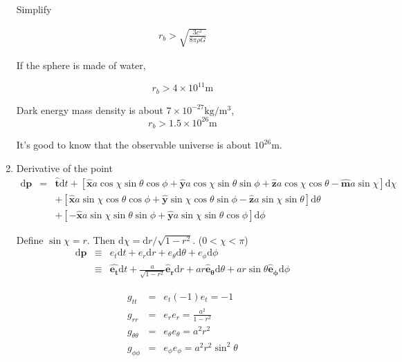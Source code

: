 \documentclass[12pt,a4paper]{article}
\begin{document}
\begin{enumerate}
Simplify

\begin{eqnarray*}
	r_b > \sqrt{ \frac{3c^2}{8\pi \rho G} }
\end{eqnarray*}

If the sphere is made of water,

\begin{equation}
	r_b > 4\times 10^11 \mathrm m
\end{equation}


Dark energy mass density is about $7\times 10^{-27} \mathrm{kg/m^3}$,
\begin{equation}
	r_b > 1.5\times 10^{26} \mathrm m
\end{equation}



It's good to know that the observable universe is about $10^{26}\mathrm m$.









\item


Derivative of the point 
\begin{eqnarray*}
	\mathrm d\bm p &=&  \bm{\hat t} \mathrm dt + [\bm{\hat x} a\cos\chi\sin\theta\cos\phi + \bm{\hat y} a\cos\chi\sin\theta\sin\phi + \bm{\hat z} a \cos\chi \cos\theta  - \bm{\hat m}a \sin\chi ]\mathrm d\chi \\
	&& + [\bm{\hat x}a\sin\chi\cos\theta\cos\phi + \bm{\hat y} \sin\chi \cos\theta \sin\phi - \bm{\hat z} a\sin\chi \sin\theta ] \mathrm d\theta \\
	&& + [- \bm{\hat x} a\sin\chi \sin\theta\sin\phi  + \bm{\hat y} a\sin\chi\sin\theta\cos\phi ]\mathrm d\phi
\end{eqnarray*}

Define $\sin\chi = r$. Then $\mathrm d\chi = \mathrm dr/\sqrt{1-r^2}$. ($0<\chi<\pi$)
\begin{eqnarray*}
	\mathrm d\bm p &\equiv&  e_t \mathrm dt + e_r \mathrm dr + e_\theta \mathrm d\theta  + e_\phi \mathrm d\phi \\
	&\equiv&  \bm {\hat {e_t}} \mathrm dt + \frac{a}{\sqrt{1-r^2}} \bm{\hat e_r}\mathrm dr + a r  \bm{\hat e_\theta} \mathrm d\theta  + a r \sin\theta \bm{\hat e_\phi} \mathrm d\phi
\end{eqnarray*}


\begin{eqnarray*}
	g_{tt} &=& e_t (-1) e_t = -1 \\
	g_{rr} &=& e_r e_r = \frac{a^2}{1-r^2} \\
	g_{\theta\theta}&=& e_\theta e_\theta =a^2 r^2 \\
	g_{\phi\phi}&=& e_\phi e_\phi = a^2 r^2 \sin^2\theta
\end{eqnarray*}





\end{enumerate}
\end{document}
